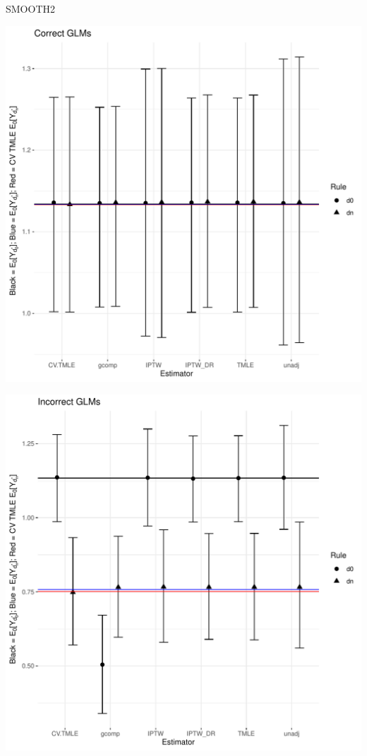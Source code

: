 \documentclass[11pt]{article}\usepackage[]{graphicx}\usepackage[]{color}
\makeatletter
\def\maxwidth{ %
  \ifdim\Gin@nat@width>\linewidth
    \linewidth
  \else
    \Gin@nat@width
  \fi
}
\newenvironment{knitrout}{}{} %
\makeatother
\begin{document}
SMOOTH2






\begin{knitrout}
\color{fgcolor}
\includegraphics[width=\maxwidth]{figure/unnamed-chunk-1-1} 

\includegraphics[width=\maxwidth]{figure/unnamed-chunk-1-2} 


\end{knitrout}
\end{document}
